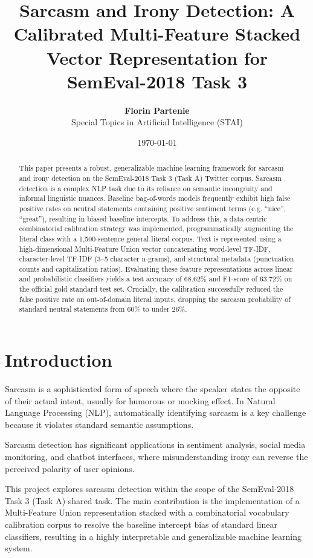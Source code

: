 \documentclass[11pt,a4paper]{article}
\title{\textbf{Sarcasm and Irony Detection: A Calibrated Multi-Feature Stacked Vector Representation for SemEval-2018 Task 3}}
\author{\textbf{Florin Partenie} \\
Special Topics in Artificial Intelligence (STAI)}
\date{\today}
\begin{document}
\maketitle

\begin{abstract}
This paper presents a robust, generalizable machine learning framework for sarcasm and irony detection on the SemEval-2018 Task 3 (Task A) Twitter corpus. Sarcasm detection is a complex NLP task due to its reliance on semantic incongruity and informal linguistic nuances. Baseline bag-of-words models frequently exhibit high false positive rates on neutral statements containing positive sentiment terms (e.g. ``nice'', ``great''), resulting in biased baseline intercepts. To address this, a data-centric combinatorial calibration strategy was implemented, programmatically augmenting the literal class with a 1,500-sentence general literal corpus. Text is represented using a high-dimensional Multi-Feature Union vector concatenating word-level TF-IDF, character-level TF-IDF (3--5 character n-grams), and structural metadata (punctuation counts and capitalization ratios). Evaluating these feature representations across linear and probabilistic classifiers yields a test accuracy of 68.62\% and F1-score of 63.72\% on the official gold standard test set. Crucially, the calibration successfully reduced the false positive rate on out-of-domain literal inputs, dropping the sarcasm probability of standard neutral statements from 60\% to under 26\%.
\end{abstract}

\section{Introduction}
Sarcasm is a sophisticated form of speech where the speaker states the opposite of their actual intent, usually for humorous or mocking effect. In Natural Language Processing (NLP), automatically identifying sarcasm is a key challenge because it violates standard semantic assumptions. 

Sarcasm detection has significant applications in sentiment analysis, social media monitoring, and chatbot interfaces, where misunderstanding irony can reverse the perceived polarity of user opinions. 

This project explores sarcasm detection within the scope of the SemEval-2018 Task 3 (Task A) shared task. The main contribution is the implementation of a Multi-Feature Union representation stacked with a combinatorial vocabulary calibration corpus to resolve the baseline intercept bias of standard linear classifiers, resulting in a highly interpretable and generalizable machine learning system.
\end{document}

